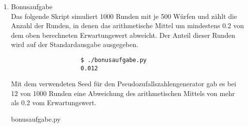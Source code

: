 \documentclass[a4paper]{scrartcl}
\begin{document}
\begin{enumerate}[label=\bfseries\arabic*.]
\begin{enumerate}[label=(\alph*)]
            \item Bonusaufgabe \\
                Das folgende Skript simuliert 1000 Runden mit je 500 Würfen und
                zählt die Anzahl der Runden, in denen das arithmetische Mittel
                um mindestens \num{0,2} von dem oben berechneten Erwartungswert
                abweicht.
                Der Anteil dieser Runden wird auf der Standardausgabe
                ausgegeben.
                \begin{verbatim}
                    $ ./bonusaufgabe.py
                    0.012
                \end{verbatim}
                Mit dem verwendeten Seed für den Pseudozufallszahlengenerator
                gab es bei 12 von 1000 Runden eine Abweichung des arithmetischen
                Mittels von mehr als \num{0,2} vom Erwartungswert.

                
                {bonusaufgabe.py}

        \end{enumerate}


\end{enumerate}
\end{document}
